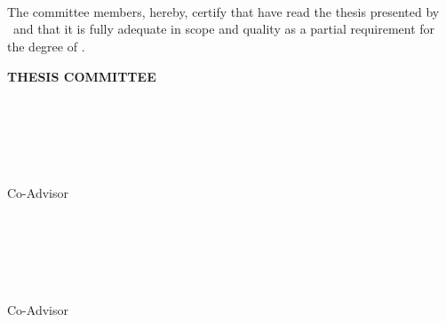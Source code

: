 %
%
%
%
%

\begin{center}\large
    \textbf{\schoolName}\\
    \textbf{\schoolCampus}\\
    \textbf{\schoolDepartment}\\
\end{center}

The  committee  members,  hereby,  certify  that  have  read  the  
thesis  presented  by \authorName\ and that it is fully 
adequate in scope and quality as a partial 
requirement  for  the  degree  of  \schoolProgram.


\begin{center}
        \textbf{THESIS COMMITTEE}
\end{center}


\begin{flushright}
        \vspace{0.25cm}
        \underline{\hspace{8cm}} \\ 
        \MakeUppercase{\firstAdvisorName} \\
        \firstAdvisorSchoolName \\
        \firstAdvisorSchoolDepartment \\
        \firstAdvisorSchoolPlace \\
        Co-Advisor 
\end{flushright}

\begin{flushright}
        \vspace{0.2cm}
        \underline{\hspace{8cm}}  \\
        \MakeUppercase{\secondAdvisorName} \\
        \secondAdvisorSchoolName \\
        \secondAdvisorSchoolDepartment \\
        \secondAdvisorSchoolPlace \\
        Co-Advisor 
\end{flushright}

